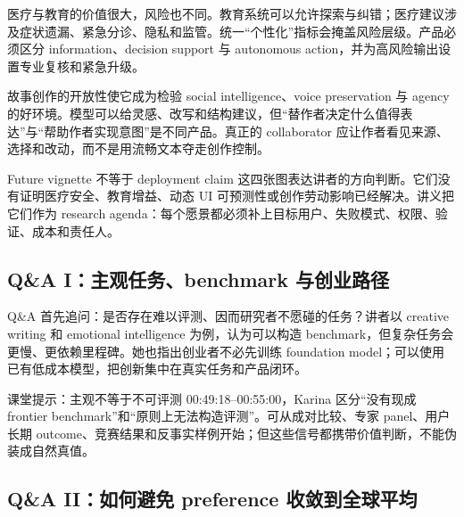 
医疗与教育的价值很大，风险也不同。教育系统可以允许探索与纠错；医疗建议涉及症状遗漏、紧急分诊、隐私和监管。统一“个性化”指标会掩盖风险层级。产品必须区分 information、decision support 与 autonomous action，并为高风险输出设置专业复核和紧急升级。


故事创作的开放性使它成为检验 social intelligence、voice preservation 与 agency 的好环境。模型可以给灵感、改写和结构建议，但“替作者决定什么值得表达”与“帮助作者实现意图”是不同产品。真正的 collaborator 应让作者看见来源、选择和改动，而不是用流畅文本夺走创作控制。

\begin{warningbox}{Future vignette 不等于 deployment claim}
这四张图表达讲者的方向判断。它们没有证明医疗安全、教育增益、动态 UI 可预测性或创作劳动影响已经解决。讲义把它们作为 research agenda：每个愿景都必须补上目标用户、失败模式、权限、验证、成本和责任人。
\end{warningbox}


\subsection{Q\&A I：主观任务、benchmark 与创业路径}

Q\&A 首先追问：是否存在难以评测、因而研究者不愿碰的任务？讲者以 creative writing 和 emotional intelligence 为例，认为可以构造 benchmark，但复杂任务会更慢、更依赖里程碑。她也指出创业者不必先训练 foundation model；可以使用已有低成本模型，把创新集中在真实任务和产品闭环。

\begin{knowledgebox}{课堂提示：主观不等于不可评测}
00:49:18--00:55:00，Karina 区分“没有现成 frontier benchmark”和“原则上无法构造评测”。可从成对比较、专家 panel、用户长期 outcome、竞赛结果和反事实样例开始；但这些信号都携带价值判断，不能伪装成自然真值。
\end{knowledgebox}

\subsection{Q\&A II：如何避免 preference 收敛到全球平均}

